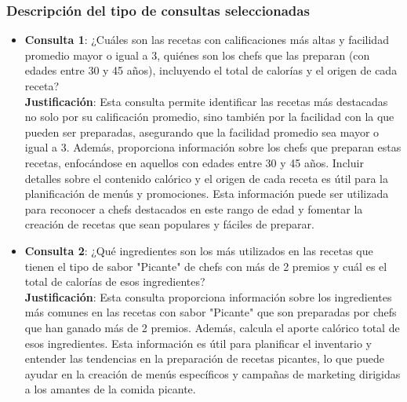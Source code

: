 \documentclass[12pt,a4paper]{article}
\begin{document}
\subsubsection{Descripción del tipo de consultas seleccionadas}
\begin{itemize}
    \item \textbf{Consulta 1}: ¿Cuáles son las recetas con calificaciones más altas y facilidad promedio mayor o igual a 3, quiénes son los chefs que las preparan (con edades entre 30 y 45 años), incluyendo el total de calorías y el origen de cada receta?\\
\textbf{Justificación}: Esta consulta permite identificar las recetas más destacadas no solo por su calificación promedio, sino también por la facilidad con la que pueden ser preparadas, asegurando que la facilidad promedio sea mayor o igual a 3. Además, proporciona información sobre los chefs que preparan estas recetas, enfocándose en aquellos con edades entre 30 y 45 años. Incluir detalles sobre el contenido calórico y el origen de cada receta es útil para la planificación de menús y promociones. Esta información puede ser utilizada para reconocer a chefs destacados en este rango de edad y fomentar la creación de recetas que sean populares y fáciles de preparar.

    \item \textbf{Consulta 2}: ¿Qué ingredientes son los más utilizados en las recetas que tienen el tipo de sabor "Picante" de chefs con más de 2 premios y cuál es el total de calorías de esos ingredientes?\\
\textbf{Justificación}: Esta consulta proporciona información sobre los ingredientes más comunes en las recetas con sabor "Picante" que son preparadas por chefs que han ganado más de 2 premios. Además, calcula el aporte calórico total de esos ingredientes. Esta información es útil para planificar el inventario y entender las tendencias en la preparación de recetas picantes, lo que puede ayudar en la creación de menús específicos y campañas de marketing dirigidas a los amantes de la comida picante.
\end{itemize}
\end{document}
